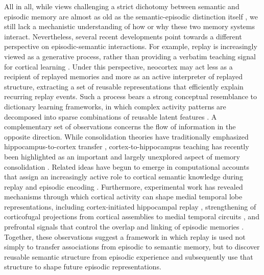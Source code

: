 \documentclass{article}
\providecommand{\DIFaddtex}[1]{{\protect\color{blue}\uwave{#1}}} %
\providecommand{\DIFaddbegin}{} %
\providecommand{\DIFaddend}{} %
\providecommand{\DIFadd}[1]{\texorpdfstring{\DIFaddtex{#1}}{#1}} %
\begin{document}
All in all, while views challenging a strict dichotomy between semantic and episodic memory are almost as old as the semantic-episodic distinction itself , we still lack a mechanistic understanding of how or why these two memory systems interact. Nevertheless, several recent developments point towards a different perspective on episodic-semantic interactions. For example, replay is increasingly viewed as a generative process, rather than providing a verbatim teaching signal for cortical learning . Under this perspective, neocortex may act less as a \DIFaddbegin \DIFadd{passive }\DIFaddend recipient of replayed memories and more as an active interpreter of replayed structure, extracting a set of reusable representations that efficiently explain recurring replay events. Such a process bears a strong conceptual resemblance to dictionary learning frameworks, in which complex activity patterns are decomposed into sparse combinations of reusable latent features . A complementary set of observations concerns the flow of information in the opposite direction. While consolidation theories have traditionally emphasized hippocampus-to-cortex transfer , cortex-to-hippocampus teaching has recently been highlighted as an important and largely unexplored aspect of memory consolidation . Related ideas have begun to emerge in computational accounts that assign an increasingly active role to cortical semantic knowledge during replay  and episodic encoding . Furthermore, experimental work has revealed mechanisms through which cortical activity can shape medial temporal lobe representations, including cortex-initiated hippocampal replay , strengthening of corticofugal projections from cortical assemblies to medial temporal circuits , and prefrontal signals that control the overlap and linking of episodic memories .  Together, these observations suggest a framework in which replay is used not simply to transfer associations from episodic to semantic memory, but to discover reusable semantic structure from episodic experience and subsequently use that structure to shape future episodic representations.
\newline\newline
\end{document}
